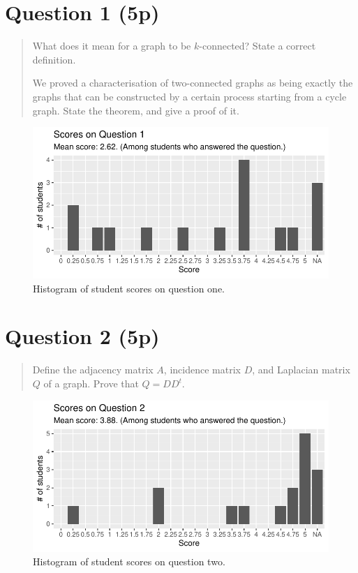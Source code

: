 \documentclass[nobib]{tufte-handout}
\begin{document}
\section{Question 1 (5p)} %

\begin{quotation}
  What does it mean for a graph to be $k$-connected? State a correct definition.

  We proved a characterisation of two-connected graphs as being exactly the graphs that can be constructed by a certain process starting from a cycle graph. State the theorem, and give a proof of it.
\end{quotation}

\begin{figure}
  \centering
  \includegraphics[width = \textwidth]{Q1.pdf}
  \caption[Score histogram for Q1]{Histogram of student scores on question one.}
  \label{fig:Q1}
\end{figure}

\section{Question 2 (5p)} %

\begin{quotation}
  Define the adjacency matrix $A$, incidence matrix $D$, and Laplacian matrix $Q$ of a graph. Prove that $Q = DD^t$.
\end{quotation}

\begin{figure}
  \centering
  \includegraphics[width = \textwidth]{Q2.pdf}
  \caption[Score histogram for Q2]{Histogram of student scores on question two.}
  \label{fig:Q2}
\end{figure}
\end{document}
